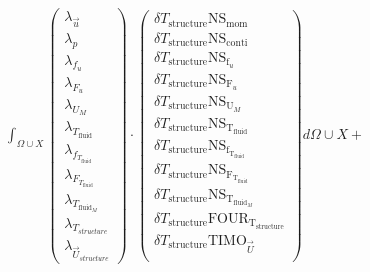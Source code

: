 \documentclass[10pt]{article} %
\begin{document}
\begin{center}
	$\int_{\Omega \cup X}
	\begin{pmatrix}
		\lambda_{\vec{u}} \\ \lambda_p \\ \lambda_{f_u} \\ \lambda_{F_u} \\ \lambda_{U_M}\\ \lambda_{T_{\text{fluid}}} \\ \lambda_{f_{T_{\text{fluid}}}} \\ \lambda_{F_{T_{\text{fluid}}}} \\ \lambda_{T_{\text{fluid}_M}} \\ \lambda_{T_{structure}} \\ \lambda_{\vec{U}_{structure}}
	\end{pmatrix}
	\cdot
	\begin{pmatrix}
		\delta T_{\text{structure}} \text{NS}_{\text{mom}} \\
		\delta T_{\text{structure}} \text{NS}_{\text{conti}}\\
		\delta T_{\text{structure}} \text{NS}_{\text{f}_u} \\
		\delta T_{\text{structure}} \text{NS}_{\text{F}_u} \\
		\delta T_{\text{structure}} \text{NS}_{\text{U}_M} \\
		\delta T_{\text{structure}} \text{NS}_{\text{T}_{\text{fluid}}} \\
		\delta T_{\text{structure}} \text{NS}_{\text{f}_{\text{T}_{\text{fluid}}}}\\
		\delta T_{\text{structure}} \text{NS}_{\text{F}_{\text{T}_{\text{fluid}}}}\\
		\delta T_{\text{structure}} \text{NS}_{\text{T}_{\text{fluid}_M}}\\
		\delta T_{\text{structure}} \text{FOUR}_{\text{T}_{\text{structure}}}\\
		\delta T_{\text{structure}} \text{TIMO}_{\vec{U}}\\
	\end{pmatrix}
	d\Omega \cup X + $\\


\end{center}
\end{document}
